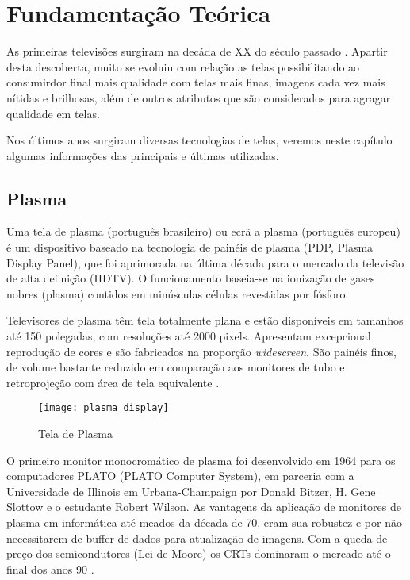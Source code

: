 \chapter{Fundamentação Teórica}
\label{cap:fundamentacao}

As primeiras televisões surgiram na decáda de XX do século passado \cite{WikipediaTelevisao}. Apartir desta descoberta, muito se evoluiu com relação as telas possibilitando ao consumirdor final mais qualidade com telas mais finas, imagens cada vez mais nítidas e brilhosas, além de outros atributos que são considerados para agragar qualidade em telas.

Nos últimos anos surgiram diversas tecnologias de telas, veremos neste capítulo algumas informações das principais e últimas utilizadas.

\section{Plasma}
\label{sec:plasma}

Uma tela de plasma (português brasileiro) ou ecrã a plasma (português europeu) é um dispositivo baseado na tecnologia de painéis de plasma (PDP, Plasma Display Panel), que foi aprimorada na última década para o mercado da televisão de alta definição (HDTV). O funcionamento baseia-se na ionização de gases nobres (plasma) contidos em minúsculas células revestidas por fósforo.

Televisores de plasma têm tela totalmente plana e estão disponíveis em tamanhos até 150 polegadas, com resoluções até 2000 pixels. Apresentam excepcional reprodução de cores e são fabricados na proporção \textit{widescreen}. São painéis finos, de volume bastante reduzido em comparação aos monitores de tubo e retroprojeção com área de tela equivalente \cite{WikipediaTelaPlasma}. 

\begin{figure}[!h]
  \centering
  \texttt{[image: plasma\_display]} 
  \caption{Tela de Plasma}
  \label{fig:plasma_display} 
\end{figure}

O primeiro monitor monocromático de plasma foi desenvolvido em 1964 para os computadores PLATO (PLATO Computer System), em parceria com a Universidade de Illinois em Urbana-Champaign por Donald Bitzer, H. Gene Slottow e o estudante Robert Wilson. As vantagens da aplicação de monitores de plasma em informática até meados da década de 70, eram sua robustez e por não necessitarem de buffer de dados para atualização de imagens. Com a queda de preço dos semicondutores (Lei de Moore) os CRTs dominaram o mercado até o final dos anos 90 \cite{WikipediaTelaPlasma}.

